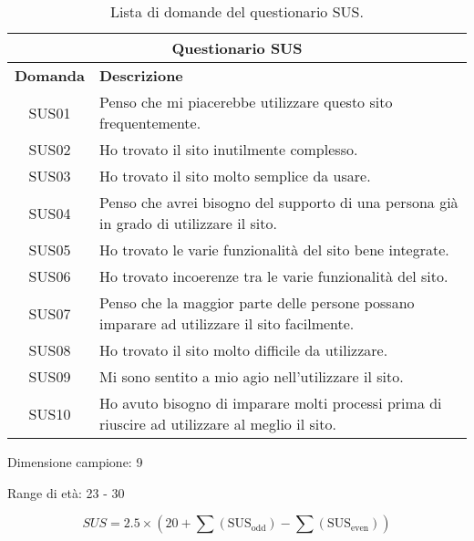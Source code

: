 
\begin{center}
    \begin{table}
        \centering
        \begin{tabularx}{1.02\textwidth}{|c|X|}
            \hline
            \multicolumn{2}{|c|}{\textbf{Questionario SUS}} \\
            \hline
            \textbf{Domanda} & \textbf{Descrizione}\\
            \hline
            SUS01 & Penso che mi piacerebbe utilizzare questo sito frequentemente.\\
            SUS02 & Ho trovato il sito inutilmente complesso.\\
            SUS03 & Ho trovato il sito molto semplice da usare.\\
            SUS04 & Penso che avrei bisogno del supporto di una persona già in grado di utilizzare il sito.\\
            SUS05 & Ho trovato le varie funzionalità del sito bene integrate.\\
            SUS06 & Ho trovato incoerenze tra le varie funzionalità del sito.\\
            SUS07 & Penso che la maggior parte delle persone possano imparare ad utilizzare il sito facilmente.\\
            SUS08 & Ho trovato il sito molto difficile da utilizzare.\\
            SUS09 & Mi sono sentito a mio agio nell'utilizzare il sito.\\
            SUS10 & Ho avuto bisogno di imparare molti processi prima di riuscire ad utilizzare al meglio il sito.\\
            \hline
        \end{tabularx}
        \caption[Lista di domande del questionario SUS]{Lista di domande del questionario SUS.}
        \label{tab:sus_questions}
    \end{table}
\end{center}

Dimensione campione: 9

Range di età: 23 - 30

\[
SUS = 2.5 \times \left( 20 + \sum (\text{SUS}_{\text{odd}}) - \sum (\text{SUS}_{\text{even}}) \right)
\]

